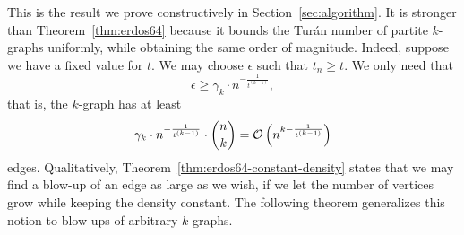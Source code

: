 This is the result we prove constructively in Section~\ref{sec:algorithm}.
It is stronger than Theorem~\ref{thm:erdos64}
because it bounds the Turán number of partite $k$-graphs uniformly,
while obtaining the same order of magnitude.
Indeed, suppose we have a fixed value for $t$.
We may choose $\epsilon$ such that $t_n \geq t$.
We only need that
\[
    \epsilon \geq \gamma_k \cdot n^{-\frac{1}{t^{(k-1)}}},
\]
that is, the $k$-graph has at least
\[
    \gamma_k \cdot n^{-\frac{1}{t^{(k-1)}}} \cdot \binom{n}{k} = \mathcal{O}\left(n^{k - \frac{1}{t^{(k-1)}}}\right)
\]
edges.
Qualitatively, Theorem~\ref{thm:erdos64-constant-density} states that
we may find a blow-up of an edge as large as we wish, if we let the number of vertices grow
while keeping the density constant.
The following theorem generalizes this notion to blow-ups of arbitrary $k$-graphs.

